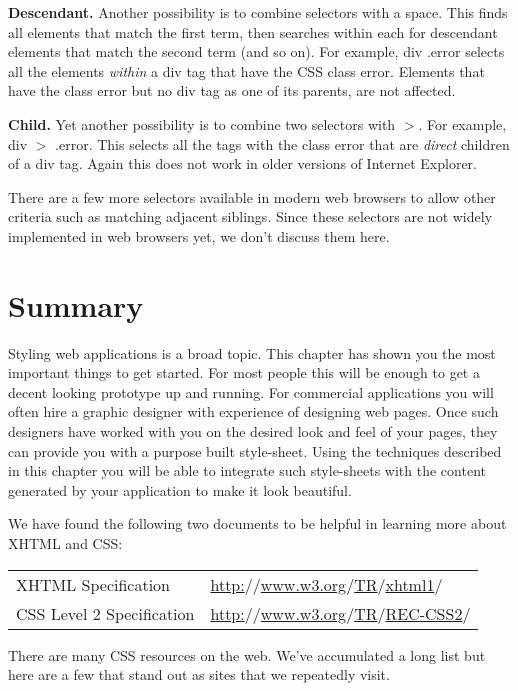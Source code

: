 \documentclass[a4paper,10pt,twoside]{book}
\newcommand{\ct}[1]{{\small\ttfamily\textup{#1}}}
\begin{document}
\textbf{Descendant.} Another possibility is to combine selectors with a space. This finds all elements that match the first term, then searches within each for descendant elements that match the second term (and so on). For example, \ct{div .error} selects all the elements \textit{within} a \ct{div} tag that have the CSS class \ct{error}. Elements that have the class \ct{error} but no \ct{div} tag as one of its parents, are not affected.

\textbf{Child.} Yet another possibility is to combine two selectors with \ct{$>$}. For example, \ct{div $>$ .error}. This selects all the tags with the class \ct{error} that are \textit{direct} children of a \ct{div} tag. Again this does not work in older versions of Internet Explorer.

There are a few more selectors available in modern web browsers to allow other criteria such as matching adjacent siblings. Since these selectors are not widely implemented in web browsers yet, we don't discuss them here.

\section{Summary}
\label{book:fundamentals:css:summary}

Styling web applications is a broad topic. This chapter has shown you the most important things to get started. For most people this will be enough to get a decent looking prototype up and running. For commercial applications you will often hire a graphic designer with experience of designing web pages. Once such designers have worked with you on the desired look and feel of your pages, they can provide you with a purpose built style-sheet. Using the techniques described in this chapter you will be able to integrate such style-sheets with the content generated by your application to make it look beautiful.

We have found the following two documents to be helpful in learning more about XHTML and CSS:

\begin{tabularx}{\textwidth}{lX}
 XHTML Specification & \href{http://www.w3.org/TR/xhtml1/}{http:$/$$/$www.w3.org$/$TR$/$xhtml1$/$}\\
 CSS Level 2 Specification & \href{http://www.w3.org/TR/REC-CSS2/}{http:$/$$/$www.w3.org$/$TR$/$REC-CSS2$/$}\\
\end{tabularx}
There are many CSS resources on the web. We've accumulated a long list but here are a few that stand out as sites that we repeatedly visit.
\end{document}
